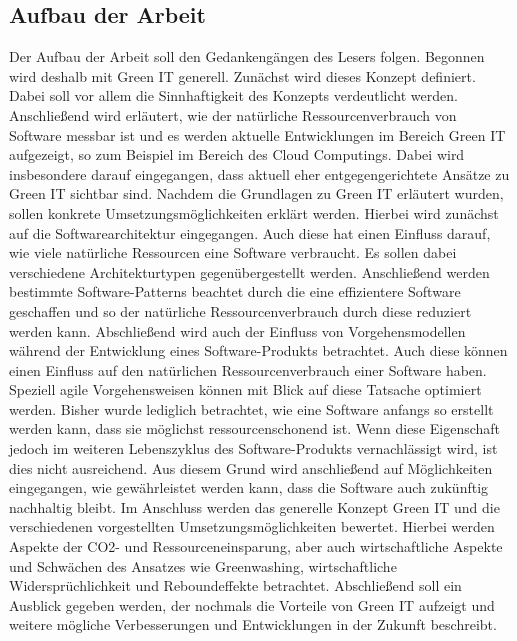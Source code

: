 \documentclass[utf8,biblatex]{lni}
\begin{document}
\subsection{Aufbau der Arbeit}
Der Aufbau der Arbeit soll den Gedankengängen des Lesers folgen. Begonnen wird deshalb mit Green IT generell. Zunächst wird dieses Konzept definiert. Dabei soll vor allem die Sinnhaftigkeit des Konzepts verdeutlicht werden.\newline
Anschließend wird erläutert, wie der natürliche Ressourcenverbrauch von Software messbar ist und es werden aktuelle Entwicklungen im Bereich Green IT aufgezeigt, so zum Beispiel im Bereich des Cloud Computings. Dabei wird insbesondere darauf eingegangen, dass aktuell eher entgegengerichtete Ansätze zu Green IT sichtbar sind. 
\newline
\newline
Nachdem die Grundlagen zu Green IT erläutert wurden, sollen konkrete Umsetzungsmöglichkeiten erklärt werden. Hierbei wird zunächst auf die Softwarearchitektur eingegangen. Auch diese hat einen Einfluss darauf, wie viele natürliche Ressourcen eine Software verbraucht. Es sollen dabei verschiedene Architekturtypen gegenübergestellt werden.
\newline
Anschließend werden bestimmte Software-Patterns beachtet durch die eine effizientere Software geschaffen und so der natürliche Ressourcenverbrauch durch diese reduziert werden kann. 
\newline
Abschließend wird auch der Einfluss von Vorgehensmodellen während der Entwicklung eines Software-Produkts betrachtet. Auch diese können einen Einfluss auf den natürlichen Ressourcenverbrauch einer Software haben. Speziell agile Vorgehensweisen können mit Blick auf diese Tatsache optimiert werden.
\newline
\newline
Bisher wurde lediglich betrachtet, wie eine Software anfangs so erstellt werden kann, dass sie möglichst ressourcenschonend ist. Wenn diese Eigenschaft jedoch im weiteren Lebenszyklus des Software-Produkts vernachlässigt wird, ist dies nicht ausreichend. Aus diesem Grund wird anschließend auf Möglichkeiten eingegangen, wie gewährleistet werden kann, dass die Software auch zukünftig nachhaltig bleibt.
\newline
\newline
Im Anschluss werden das generelle Konzept Green IT und die verschiedenen vorgestellten Umsetzungsmöglichkeiten bewertet. Hierbei werden Aspekte der CO2- und Ressourceneinsparung, aber auch wirtschaftliche Aspekte und Schwächen des Ansatzes wie Greenwashing, wirtschaftliche Widersprüchlichkeit und Reboundeffekte betrachtet.
\newline
Abschließend soll ein Ausblick gegeben werden, der nochmals die Vorteile von Green IT aufzeigt und weitere mögliche Verbesserungen und Entwicklungen in der Zukunft beschreibt.
\end{document}
